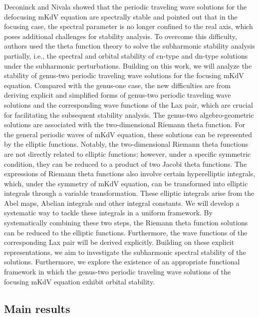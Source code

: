 \documentclass[11pt,reqno]{amsart}
\newcommand{\cn}{\mathrm{cn}}
\newcommand{\dn}{\mathrm{dn}}
\numberwithin{equation}{section}
\begin{document}
Deconinck and Nivala \cite{Deconinck-10} showed that the periodic traveling wave solutions for the defocusing mKdV equation are spectrally stable and pointed out that in the focusing case, the spectral parameter is no longer confined to the real axis, which poses additional challenges for stability analysis.
To overcome this difficulty, authors \cite{LingS-23-mKdV-stability} used the theta function theory to solve the subharmonic stability analysis partially, i.e., the spectral and orbital stability of $\cn$-type and $\dn$-type solutions under the subharmonic perturbations. Building on this work, we will analyze the stability of genus-two periodic traveling wave solutions  for the focusing mKdV equation. 
Compared with the genus-one case, the new difficulties are from deriving explicit and simplified forms of genus-two periodic traveling wave solutions  and the corresponding wave functions of the Lax pair, which are crucial for facilitating the subsequent stability analysis. 
The genus-two algebro-geometric solutions are associated with the two-dimensional Riemann theta function. For the general periodic waves of mKdV equation, these solutions can be represented by the elliptic functions. Notably, the two-dimensional Riemann theta functions are not directly related to elliptic functions; however, under a specific symmetric condition, they can be reduced to a product of two Jacobi theta functions. The expressions of Riemann theta functions also involve certain hyperelliptic integrals, which, under the symmetry of mKdV equation, can be transformed into elliptic integrals through a variable transformation. These elliptic integrals arise from the Abel maps, Abelian integrals and other integral constants. We will develop a systematic way to tackle these integrals in a uniform framework. By systematically combining these two steps, the Riemann theta function solutions can be reduced to the elliptic functions. Furthermore, the wave functions of the corresponding Lax pair will be derived explicitly.
Building on these explicit representations, we aim to investigate the subharmonic spectral stability of the solutions.
Furthermore, we explore the existence of an appropriate functional framework in which the genus-two periodic traveling wave solutions  of the focusing mKdV equation exhibit orbital stability.

\subsection{Main results}
\end{document}
